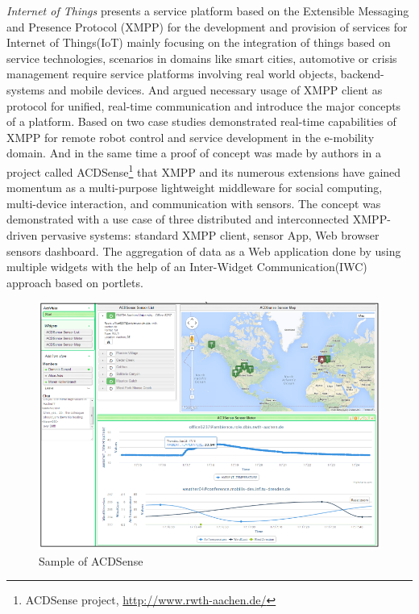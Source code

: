 	\emph{Internet of Things}\cite{bendel2013service} presents a service platform based on the Extensible Messaging and Presence Protocol (XMPP) for the development and provision of services for Internet of Things(IoT) mainly focusing on the integration of things based on service technologies, scenarios in domains like smart cities, automotive or crisis management require service platforms involving real world objects, backend-systems and mobile devices. And argued necessary usage of XMPP client as protocol for unified, real-time communication and introduce the major concepts of a platform. Based on two case studies demonstrated real-time capabilities of XMPP for remote robot control and service development in the e-mobility domain. And in the same time a proof of concept was made by authors in a project called ACDSense\footnote{ACDSense project, \url{http://www.rwth-aachen.de/}} that XMPP and its numerous extensions have gained momentum as a multi-purpose lightweight middleware for social computing, multi-device interaction, and communication with sensors. The concept was demonstrated with a use case of three distributed and interconnected XMPP-driven pervasive systems: standard XMPP client, sensor App, Web browser sensors dashboard. The aggregation of data as a Web application done by using multiple widgets with the help of an Inter-Widget Communication(IWC) approach based on portlets\cite{ACDSense}.
	    \begin{figure}[!ht]
		\centering
		\includegraphics[scale=0.5]{Material/examples/ACDSense.png}   
		\caption[Sample of ACDSense]{Sample of ACDSense}                  
		\end{figure} 

